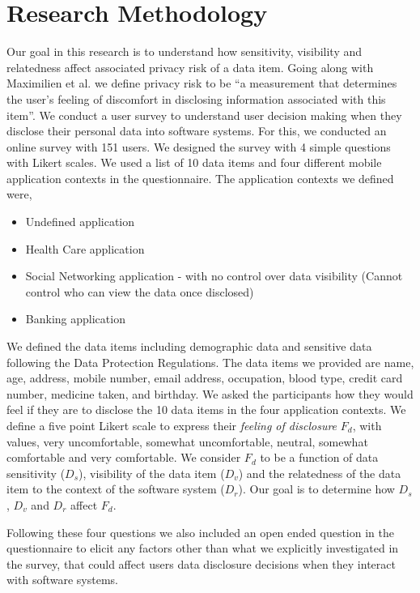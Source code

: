 \documentclass[conference]{IEEEtran}
\begin{document}
\section {Research Methodology}

Our goal in this research is to understand how sensitivity, visibility and relatedness affect associated privacy risk of a data item. Going along with Maximilien et al. \cite {maximilien2009privacy} we define privacy risk to be \enquote{a measurement that determines the user's feeling of discomfort in disclosing information associated with this item}. We conduct a user survey to understand user decision making when they disclose their personal data into software systems. For this, we conducted an online survey with 151 users. We designed the survey with 4 simple questions with Likert scales. We used a list of 10 data items and four different mobile application contexts in the questionnaire. The application contexts we defined were,

\begin{itemize}
\item Undefined application
\item Health Care application
\item Social Networking application - with no control over data visibility (Cannot control who can view the data once disclosed)
\item Banking application
\end{itemize}

We defined the data items including demographic data and sensitive data following the Data Protection Regulations. The data items we provided are name, age, address, mobile number, email address, occupation, blood type, credit card number, medicine taken, and birthday. We asked the participants how they would feel if they are to disclose the 10 data items in the four application contexts. We define a five point Likert scale to express their \textit{feeling of disclosure} $F_d$, with values, very uncomfortable, somewhat uncomfortable, neutral, somewhat comfortable and very comfortable. We consider $F_d$ to be a function of data sensitivity ($D_s$), visibility of the data item ($D_v$) and the relatedness of the data item to the context of the software system ($D_r$). Our goal is to determine how $D_s$, $D_v$ and $D_r$ affect $F_d$.

Following these four questions we also included an open ended question in the questionnaire to elicit any factors other than what we explicitly investigated in the survey, that could affect users data disclosure decisions when they interact with software systems. 
\end{document}
